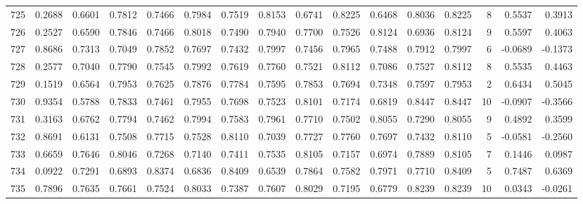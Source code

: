 \begin{tabular}{lrrrrrrrrrrrrrrr}
725 &      0.2688 &  0.6601 &  0.7812 &  0.7466 &  0.7984 &  0.7519 &  0.8153 &  0.6741 &  0.8225 &  0.6468 &   0.8036 &     0.8225 &      8 &                    0.5537 &                     0.3913 \\
726 &      0.2527 &  0.6590 &  0.7846 &  0.7466 &  0.8018 &  0.7490 &  0.7940 &  0.7700 &  0.7526 &  0.8124 &   0.6936 &     0.8124 &      9 &                    0.5597 &                     0.4063 \\
727 &      0.8686 &  0.7313 &  0.7049 &  0.7852 &  0.7697 &  0.7432 &  0.7997 &  0.7456 &  0.7965 &  0.7488 &   0.7912 &     0.7997 &      6 &                   -0.0689 &                    -0.1373 \\
728 &      0.2577 &  0.7040 &  0.7790 &  0.7545 &  0.7992 &  0.7619 &  0.7760 &  0.7521 &  0.8112 &  0.7086 &   0.7527 &     0.8112 &      8 &                    0.5535 &                     0.4463 \\
729 &      0.1519 &  0.6564 &  0.7953 &  0.7625 &  0.7876 &  0.7784 &  0.7595 &  0.7853 &  0.7694 &  0.7348 &   0.7597 &     0.7953 &      2 &                    0.6434 &                     0.5045 \\
730 &      0.9354 &  0.5788 &  0.7833 &  0.7461 &  0.7955 &  0.7698 &  0.7523 &  0.8101 &  0.7174 &  0.6819 &   0.8447 &     0.8447 &     10 &                   -0.0907 &                    -0.3566 \\
731 &      0.3163 &  0.6762 &  0.7794 &  0.7462 &  0.7994 &  0.7583 &  0.7961 &  0.7710 &  0.7502 &  0.8055 &   0.7290 &     0.8055 &      9 &                    0.4892 &                     0.3599 \\
732 &      0.8691 &  0.6131 &  0.7508 &  0.7715 &  0.7528 &  0.8110 &  0.7039 &  0.7727 &  0.7760 &  0.7697 &   0.7432 &     0.8110 &      5 &                   -0.0581 &                    -0.2560 \\
733 &      0.6659 &  0.7646 &  0.8046 &  0.7268 &  0.7140 &  0.7411 &  0.7535 &  0.8105 &  0.7157 &  0.6974 &   0.7889 &     0.8105 &      7 &                    0.1446 &                     0.0987 \\
734 &      0.0922 &  0.7291 &  0.6893 &  0.8374 &  0.6836 &  0.8409 &  0.6539 &  0.7864 &  0.7582 &  0.7971 &   0.7710 &     0.8409 &      5 &                    0.7487 &                     0.6369 \\
735 &      0.7896 &  0.7635 &  0.7661 &  0.7524 &  0.8033 &  0.7387 &  0.7607 &  0.8029 &  0.7195 &  0.6779 &   0.8239 &     0.8239 &     10 &                    0.0343 &                    -0.0261 \\

\end{tabular}
